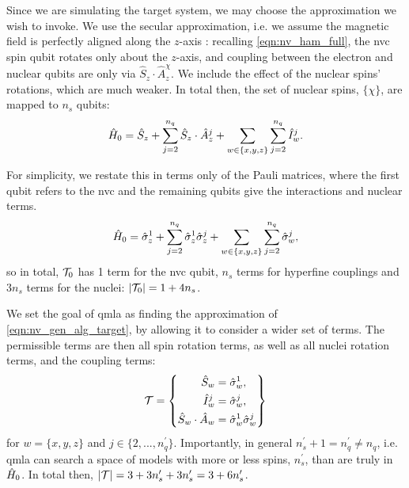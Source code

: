 Since we are simulating the target system, we may choose the approximation we wish to invoke. 
We use the secular approximation, i.e. we assume the magnetic field is perfectly aligned along 
    the $z$-axis \cite{rowan1965electron}:
    recalling \cref{eqn:nv_ham_full}, the \gls{nvc} spin qubit rotates only about the $z$-axis, 
    and coupling between the electron and nuclear qubits are only via $\hat{S}_z \cdot \hat{A}_z^{\chi}$.
We include the effect of the nuclear spins' rotations, which are much weaker. 
In total then, the set of nuclear spins, $\{\chi\}$, are mapped to $n_s$ qubits:
\begin{equation}
    \hat{H}_0 = \hat{S}_z 
    + \sum\limits_{ j=2 }^{n_q} \hat{S}_z \cdot \hat{A}_z^{j} 
    + \sum\limits_{w \in \{x,y,z\}} \sum\limits_{ j=2 }^{n_q} \hat{I}_w^{j}.
\end{equation}

For simplicity, we restate this in terms only of the Pauli matrices,
    where the first qubit refers to the \gls{nvc} and the remaining qubits give the interactions and nuclear terms.
\begin{equation}
    \label{eqn:nv_gen_alg_target}
    \hat{H}_0 = \hat{\sigma}_{z}^1 
    + \sum\limits_{ j=2 }^{n_q} \hat{\sigma}_{z}^1 \hat{\sigma}_{z}^j 
    + \sum\limits_{w \in \{x,y,z\}} \sum\limits_{ j=2 }^{n_q} \hat{\sigma}_w^j,
\end{equation}
    so in total, ${ \mathcal{T} }_0$ has 1 term for the \gls{nvc} qubit, $n_s$ terms for hyperfine couplings
    and $3n_s$ terms for the nuclei: $\left\lvert { \mathcal{T} }_0 \right\rvert = 1 + 4n_s$.
\par 

We set the goal of \gls{qmla} as finding the approximation of \cref{eqn:nv_gen_alg_target},
    by allowing it to consider a wider set of terms. 
The permissible terms are then all spin rotation terms, 
    as well as all nuclei rotation terms, and the coupling terms:
\begin{equation}
    { \mathcal{T} } = \left\{ 
        \begin{split}    
            \hat{S}_w &= \hat{\sigma}_w^{1}, \\
            \hat{I}_w^{j} &= \hat{\sigma}_w^{j}, \\
            \hat{S}_w \cdot \hat{A}_w &= \hat{\sigma}_w^1 \hat{\sigma}_w^j
        \end{split}
    \right\}
    \label{eqn:nv_ga_terms}
\end{equation}
    for $w=\{ x, y, z \}$ and $j \in \{ 2, ..., n_q^{\prime} \}$.
Importantly, in general $n_s^{\prime}+1 = n_q^{\prime} \neq n_q$, i.e. \gls{qmla} can search a space of models
    with more or less spins, $n_s^{\prime}$, than are truly in $\hat{H}_0$.  
In total then, $\left\lvert { \mathcal{T} } \right\rvert = 3 + 3n_s^{\prime} + 3 n_s^{\prime} = 3 + 6 n_s^{\prime}$. 

